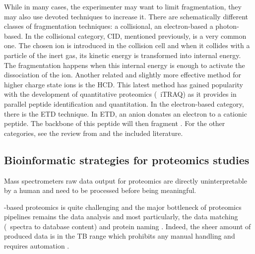 While in many cases, the experimenter may want to limit fragmentation, they may
also use devoted techniques to increase it. There are schematically different
classes of fragmentation techniques: a collisional, an
electron-based a photon-based. In the collisional category, \gls{CID},
mentioned previously, is a very common one. The chosen ion is introduced in the
collision cell and when it collides with a particle of the inert gas, its kinetic
energy is transformed into internal energy. The fragmentation happens when this
internal energy is enough to activate the dissociation of the ion. Another
related and slightly more effective method for higher charge state ions is the
\acrfull{HCD}. This latest method has gained popularity with the development of
quantitative proteomics (\eg\ \gls{iTRAQ}) as it provides in parallel peptide
identification and quantitation. In the electron-based category, there is the
\acrfull{ETD} technique. In \gls{ETD}, an anion donates an electron to a cationic
peptide. The backbone of this peptide will then fragment .
For the other categories, see the review from  and the included
literature.

\subsection{Bioinformatic strategies for proteomics studies}

Mass spectrometers raw data output for proteomics are directly uninterpretable
by a human and need to be processed before being meaningful.

\ms-based proteomics is quite challenging and the major bottleneck of
proteomics pipelines remains the data analysis  and
most particularly, the data matching (\ms\ spectra to database content) and
protein naming . Indeed, the sheer amount of produced data
is in the \gls{TB} range which prohibits any manual handling and requires
automation .

